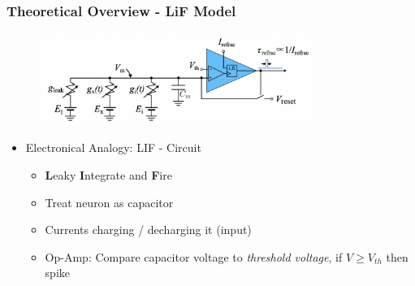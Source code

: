 \documentclass{beamer}
\begin{document}
\begin{frame}
    
    \frametitle{Theoretical Overview - LiF Model}
    
     \begin{figure}
    		\centering
    		\includegraphics[width=0.8\textwidth]{figures/lif_script.png}
    \end{figure}
    
     \begin{itemize}
   	
   		\item Electronical Analogy: LIF - Circuit
   		\begin{itemize}
   				\item \textbf{L}eaky \textbf{I}ntegrate and \textbf{F}ire
   				\item Treat neuron as capacitor
   				\item Currents charging / decharging it (input)
   				\item Op-Amp: Compare capacitor voltage to \textit{threshold voltage},  if 
   				$V\geq V_{th}$ then spike
   		\end{itemize}
 	\end{itemize}

\end{frame}
\end{document}
